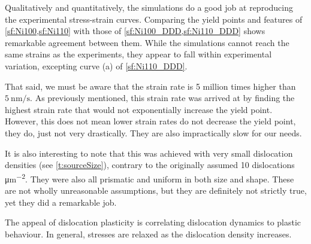 Qualitatively and quantitatively, the simulations do a good job at reproducing the experimental stress-strain curves. Comparing the yield points and features of \cref{sf:Ni100,sf:Ni110} with those of \cref{sf:Ni100_DDD,sf:Ni110_DDD} shows remarkable agreement between them. While the simulations cannot reach the same strains as the experiments, they appear to fall within experimental variation, excepting curve (a) of \cref{sf:Ni110_DDD}.

That said, we must be aware that the strain rate is 5 million times higher than $\SI{5}{\nano\meter\per\second}$. As previously mentioned, this strain rate was arrived at by finding the highest strain rate that would not exponentially increase the yield point. However, this does not mean lower strain rates do not decrease the yield point, they do, just not very drastically. They are also impractically slow for our needs.

It is also interesting to note that this was achieved with very small dislocation densities (see \cref{t:sourceSize}), contrary to the originally assumed 10 dislocations \si{\micro\metre^{-2}}. They were also all prismatic and uniform in both size and shape. These are not wholly unreasonable assumptions, but they are definitely not strictly true, yet they did a remarkable job.

The appeal of dislocation plasticity is correlating dislocation dynamics to plastic behaviour. In general, stresses are relaxed as the dislocation density increases.

